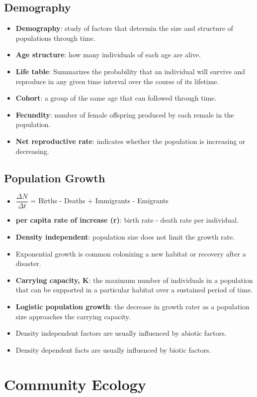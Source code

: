 \documentclass[12pt,a4paper]{article}
\begin{document}
\subsection{Demography}
\begin{itemize}
    \item \textbf{Demography}: study of factors that determin the size and structure of populations through time.
    \item \textbf{Age structure}: how many individuals of each age are alive. 
    \item \textbf{Life table}: Summarizes the probability that an individual will survive and reproduce in any given time interval over the course of its lifetime.
    \item \textbf{Cohort}: a group of the same age that can followed through time.
    \item \textbf{Fecundity}: number of female offspring produced by each remale in the population.
    \item \textbf{Net reproductive rate}: indicates whether the population is increasing or decreasing.
\end{itemize}

\subsection{Population Growth}
\begin{itemize}
    \item \(\dfrac{\Delta N}{\Delta t}\) = Births - Deaths + Immigrants - Emigrants
    \item \textbf{per capita rate of increase (r)}: birth rate - death rate per individual.
    \item \textbf{Density independent}: population size does not limit the growth rate.
    \item Exponential growth is common colonizing a new habitat or recovery after a disaster.
    \item \textbf{Carrying capacity, K}: the maximum number of individuals in a population that can be supported in a particular habitat over a sustained period of time.
    \item \textbf{Logistic population growth}: the decrease in growth rater as a population size approaches the carrying capacity.
    \item Density independent factors are usually influenced by abiotic factors.
    \item Density dependent facts are usually influenced by biotic factors.
\end{itemize}

\clearpage
\section{Community Ecology}
\end{document}
